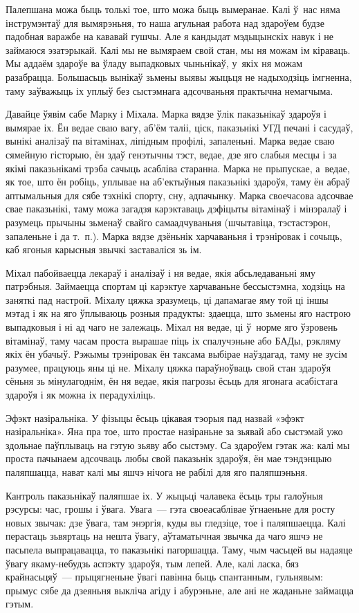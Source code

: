 Палепшана можа быць толькі тое, што можа быць вымеранае. Калі ў~нас няма інструмэнтаў для вымярэньня, то наша агульная работа над здароўем будзе падобная варажбе на кававай гушчы. Але я кандыдат мэдыцынскіх навук і не займаюся эзатэрыкай. Калі мы не вымяраем свой стан, мы ня можам ім кіраваць. Мы аддаём здароўе ва ўладу выпадковых чыньнікаў, у~якіх ня можам разабрацца. Большасьць вынікаў зьмены выявы жыцьця не надыходзіць імгненна, таму заўважыць іх уплыў без сыстэмнага адсочваньня практычна немагчыма.

Давайце ўявім сабе Марку і Міхала. Марка вядзе ўлік паказьнікаў здароўя і вымярае іх. Ён ведае сваю вагу, аб'ём таліі, ціск, паказьнікі УГД печані і сасудаў, вынікі аналізаў па вітамінах, ліпідным профілі, запаленьні. Марка ведае сваю сямейную гісторыю, ён здаў генэтычны тэст, ведае, дзе яго слабыя месцы і за якімі паказьнікамі трэба сачыць асабліва старанна. Марка не прыпускае, а~ведае, як тое, што ён робіць, уплывае на аб'ектыўныя паказьнікі здароўя, таму ён абраў аптымальныя для сябе тэхнікі спорту, сну, адпачынку. Марка своечасова адсочвае свае паказьнікі, таму можа загадзя карэктаваць дэфіцыты вітамінаў і мінэралаў і разумець прычыны зьменаў свайго самаадчуваньня (шчытавіца, тэстастэрон, запаленьне і да т.~п.). Марка вядзе дзёньнік харчаваньня і трэніровак і сочыць, каб ягоныя карысныя звычкі заставаліся зь ім.

Міхал пабойваецца лекараў і аналізаў і ня ведае, якія абсьледаваньні яму патрэбныя. Займаецца спортам ці карэктуе харчаваньне бессыстэмна, ходзіць на заняткі пад настрой. Міхалу цяжка зразумець, ці дапамагае яму той ці іншы мэтад і як на яго ўплываюць розныя прадукты: здаецца, што зьмены яго настрою выпадковыя і ні ад чаго не залежаць. Міхал ня ведае, ці ў~норме яго ўзровень вітамінаў, таму часам проста вырашае піць іх спалучэньне або БАДы, рэкляму якіх ён убачыў. Рэжымы трэніровак ён таксама выбірае наўздагад, таму не зусім разумее, працуюць яны ці не. Міхалу цяжка параўноўваць свой стан здароўя сёньня зь мінулагоднім, ён ня ведае, якія пагрозы ёсьць для ягонага асабістага здароўя і як можна іх перадухіліць.

Эфэкт назіральніка. У фізыцы ёсьць цікавая тэорыя пад назвай «эфэкт назіральніка». Яна пра тое, што простае назіраньне за зьявай або сыстэмай ужо здольнае паўплываць на гэтую зьяву або сыстэму. Са здароўем гэтак жа: калі мы проста пачынаем адсочваць любы свой паказьнік здароўя, ён мае тэндэнцыю паляпшацца, нават калі мы яшчэ нічога не рабілі для яго паляпшэньня.

Кантроль паказьнікаў паляпшае іх. У жыцьці чалавека ёсьць тры галоўныя рэсурсы: час, грошы і ўвага. Увага~--- гэта своеасаблівае ўгнаеньне для росту новых звычак: дзе ўвага, там энэргія, куды вы гледзіце, тое і паляпшаецца. Калі перастаць зьвяртаць на нешта ўвагу, аўтаматычная звычка да чаго яшчэ не пасьпела выпрацавацца, то паказьнікі пагоршацца. Таму, чым часьцей вы надаяце ўвагу якаму-небудзь аспэкту здароўя, тым лепей. Але, калі ласка, бяз крайнасьцяў~--- прыцягненьне ўвагі павінна быць спантанным, гульнявым: прымус сябе да дзеяньня выкліча агіду і абурэньне, але ані не жаданьне займацца гэтым.

